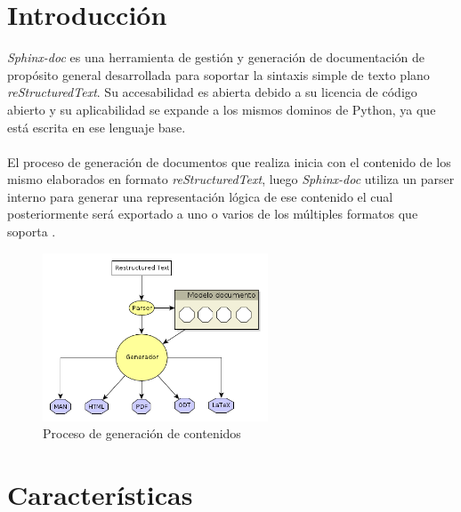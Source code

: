 \documentclass{sig-alternate}
\begin{document}


\section{Introducci\'on}

  \emph{Sphinx-doc} es una herramienta de gesti\'on y generaci\'on 
  de documentaci\'on de prop\'osito general desarrollada para 
  soportar la sintaxis simple de texto plano \emph{reStructuredText}. 
  Su accesabilidad es abierta debido a su licencia de c\'odigo abierto
  y su aplicabilidad se expande a los mismos dominos de Python, 
  ya que est\'a escrita en ese lenguaje base.
  \\ \\
  El proceso de generaci\'on de documentos que realiza inicia con 
  el contenido de los mismo elaborados en formato \emph{reStructuredText}, 
  luego \emph{Sphinx-doc} utiliza un parser interno para generar una 
  representaci\'on l\'ogica de ese contenido el cual posteriormente 
  ser\'a exportado a uno o varios de los m\'ultiples formatos 
  que soporta \cite{sphinx0}.
  \\ 
  \begin{figure}[!htbp]
        \centerline{\includegraphics[height=5cm]{sphinx_model.png}}
	\caption{Proceso de generaci\'on de contenidos}
  \end{figure}
  
\section{Caracter\'isticas}
\end{document}
